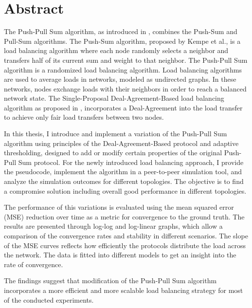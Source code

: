 \chapter*{Abstract}

The Push-Pull Sum algorithm, as introduced in \cite{nugroho2023PushPullSumDataAg}, combines the Push-Sum \cite{kempe2003gossipbasedComp} and Pull-Sum algorithms. The Push-Sum algorithm, proposed by Kempe et al., is a load balancing algorithm where each node randomly selects a neighbor and transfers half of its current sum and weight to that neighbor. The Push-Pull Sum algorithm is a randomized load balancing algorithm. Load balancing algorithms are used to average loads in networks, modeled as undirected graphs. In these networks, nodes exchange loads with their neighbors in order to reach a balanced network state. The Single-Proposal Deal-Agreement-Based load balancing algorithm as proposed in \cite{Dinitz2023DAB}, incorporates a Deal-Agreement into the load transfer to achieve only fair load transfers between two nodes.

In this thesis, I introduce and implement a variation of the Push-Pull Sum algorithm using principles of the Deal-Agreement-Based protocol and adaptive thresholding, designed to add or modify certain properties of the original Push-Pull Sum protocol. For the newly introduced load balancing approach, I provide the pseudocode, implement the algorithm in a peer-to-peer simulation tool, and analyze the simulation outcomes for different topologies. The objective is to find a compromise solution including overall good performance in different topologies.

The performance of this variations is evaluated using the mean squared error (MSE) reduction over time as a metric for convergence to the ground truth. The results are presented through log-log and log-linear graphs, which allow a comparison of the convergence rates and stability in different scenarios. The slope of the MSE curves reflects how efficiently the protocols distribute the load across the network. The data is fitted into different models to get an insight into the rate of convergence.

The findings suggest that modification of the Push-Pull Sum algorithm incorporates a more efficient and more scalable load balancing strategy for most of the conducted experiments.